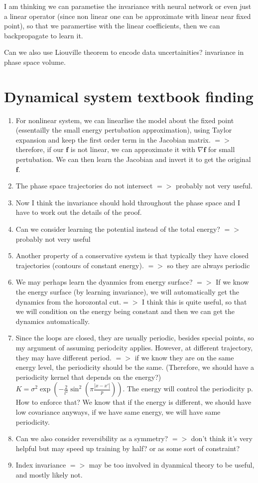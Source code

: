 \documentclass{article}
\begin{document}
I am thinking we can parametise the invariance with neural network or even just a linear operator (since non linear one can be approximate with linear near fixed point), so that we paramertise with the linear coefficients, then we can backpropagate to learn it.  

Can we also use Liouville theorem to encode data uncertainities? invariance in phase space volume.

\section*{Dynamical system textbook finding}
\begin{enumerate}
\item For nonlinear system, we can linearlise the model about the fixed point (essentailly the small energy pertubation approximation), using Taylor expansion and keep the first order term in the Jacobian matrix. $=>$ therefore, if our $\mathbf{f}$ is not linear, we can approximate it with $\nabla \mathbf{f}$ for small pertubation. We can then learn the Jacobian and invert it to get the original $\mathbf{f}$. 

\item The phase space trajectories do not intersect $=>$ probably not very useful.
\item Now I think the invariance should hold throughout the phase space and I have to work out the details of the proof.
\item Can we consider learning the potential instead of the total energy? $=>$ probably not very useful
\item Another property of a conservative system is that typically they have closed trajectories (contours of constant energy). $=>$ so they are always periodic
\item We may perhaps learn the dyanmics from energy surface? $=>$ If we know the energy surface (by learning invariance), we will automatically get the dynamics from the horozontal cut.$=>$ I think this is quite useful, so that we will condition on the energy being constant and then we can get the dynamics automatically.
\item Since the loops are closed, they are usually periodic, besides special points, so my argument of assuming periodcity applies. However, at different trajectory, they may have different period. $=>$ if we know they are on the same energy level, the periodicity should be the same. (Therefore, we should have a periodicity kernel that depends on the energy?) $K = \sigma^2 \exp\left(-\frac{2}{l^2}\sin^2\left(\pi \frac{|x-x'|}{p}\right)\right)$. The energy will control the periodicity p. How to enforce that? We know that if the energy is different, we should have low covariance anyways, if we have same energy, we will have same periodicity. 
\item Can we also consider reversibility as a symmetry? $=>$ don't think it's very helpful but may speed up training by half? or as some sort of constraint?
\item Index invariance $=>$ may be too involved in dyanmical theory to be useful, and mostly likely not. 


\end{enumerate}
\iffalse
\end{document}
